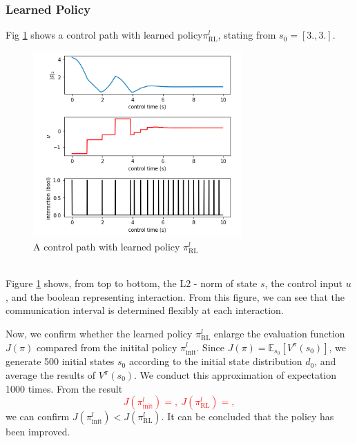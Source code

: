 \documentclass[english, dvipdfmx]{ampmt}             %
\newcommand{\unc}[1]{\textcolor{red}{#1}} %
\newcommand{\expect}{\mathbb{E}}
\begin{document}
\subsubsection{Learned Policy}
Fig \ref{path_l} shows a control path with learned policy$\pi^l_{\textrm{RL}}$, stating from $s_0 = [3., 3.]$.
\begin{figure}[h]
	\centering
 	\includegraphics[width=8cm]{path_l.png}
 	\caption{A control path with learned policy $\pi^l_{\textrm{RL}}$} \label{path_l}
\end{figure}\\
Figure \ref{path_l} shows, from top to bottom, the L2 - norm of state $s$, the control input $u$, and the boolean representing interaction. From this figure, we can see that the communication interval is determined flexibly at each interaction.\par
Now, we confirm whether the learned policy $\pi^l_{\textrm{RL}}$ enlarge the evaluation function $J(\pi)$ compared from the initital policy $\pi^l_{\textrm{init}}$. Since $J(\pi) = \expect_{s_0}[V^{\pi}(s_0)]$, we generate 500 initial states $s_0$ according to the initial state distribution $d_0$, and average the results of $V^{\pi}(s_0)$. We conduct this approximation of expectation 1000 times. From the result
\unc{
\begin{equation}
	J(\pi^l_{\textrm{init}}) = , ~J(\pi^l_{\textrm{RL}}) = , 
\end{equation}
}
we can confirm $J(\pi^l_{\textrm{init}}) < J(\pi^l_{\textrm{RL}})$. It can be concluded that the policy has been improved.
\end{document}
